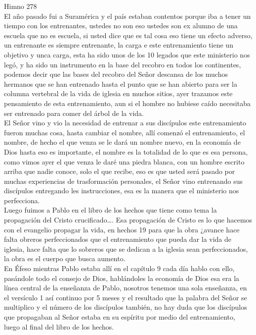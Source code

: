 \documentclass[12pt]{article}
\begin{document}
Himno 278\\

El año pasado fui a Suramérica y el país estaban contentos porque iba a tener un tiempo con los entrenantes, ustedes no son eso ustedes son ex alumno de una escuela que no es escuela, si usted dice que es tal cosa eso tiene un efecto adverso, un entrenante es siempre entrenante, la carga e este entrenamiento tiene un objetivo y unca carga, esta ha sido unos de los 10 legados que este ministerio nos legó, y ha sido un instrumento en la base del recobro en todos los continentes, podemos decir que las bases del recobro del Señor descansa de los muchos hermanos que se han entrenado hasta el punto que se han abierto para ser la columna vertebral de la vida de iglesia en muchos sitios, ayer trazamos este pensamiento de esta entrenamiento, aun si el hombre no hubiese caído necesitaba ser entrenado para comer del árbol de la vida.\\

El Señor vino y vio la necesidad de entrenar a sus discípulos este entrenamiento fueron muchas cosa, hasta cambiar el nombre, allí comenzó el entrenamiento, el nombre, de hecho el que venza se le dará un nombre nuevo, en la economía de Dios hasta eso es importante, el nombre es la totalidad de lo que es esa persona, como vimos ayer el que venza le daré una piedra blanca, con un hombre escrito arriba que nadie conoce, solo el que recibe, eso es que usted será pasado por muchas experiencias de trasformación personales, el Señor vino entrenando sus discípulos entregando les instrucciones, esa es la manera que el ministerio nos perfecciona.\\

Luego fuimos a Pablo en el libro de los hechos que tiene como tema la propagación del Cristo crucificado…. Esa propagación de Cristo es lo que hacemos con el evangelio propagar la vida, en hechos 19 para que la obra ¿avance hace falta obreros perfeccionados que el entrenamiento que pueda dar la vida de iglesia, hace falta que lo sobreros que se dedican a la iglesia sean perfeccionados, la obra es el cuerpo que busca aumento.\\

En Éfeso mientras Pablo estaba allí en el capítulo 9 cada día hablo con ello, pasándole todo el consejo de Dios, hablándoles la economía de Dios esa era la línea central de la enseñanza de Pablo, nosotros tenemos una sola enseñanza, en el versículo 1 así continuo por 5 meses y el resultado que la palabra del Señor se multiplico y el número de los discípulos también, no hay duda que los discípulos que propagaban al Señor estaba en su espíritu por medio del entrenamiento, luego al final del libro de los hechos.\\
\end{document}

